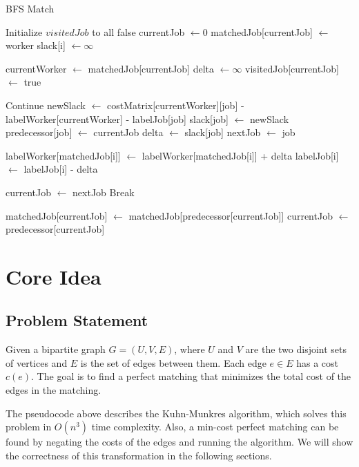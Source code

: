 \documentclass[a4paper,12pt]{article}
\begin{document}
\begin{algorithm}[H]
	\caption{BFS Match}
		Initialize $visitedJob$ to all false\;
		\BlankLine
		currentJob $\gets 0$\;
		matchedJob[currentJob] $\gets$ worker\;
		 {
			slack[i] $\gets \infty$\;
		}
		 {
			currentWorker $\gets$ matchedJob[currentJob]\;
			delta $\gets \infty$\;
			visitedJob[currentJob] $\gets$ true\;
			
			 {
				 {
					Continue\;
				}
				newSlack $\gets$ costMatrix[currentWorker][job] - labelWorker[currentWorker] - labelJob[job]\;
				 {
					slack[job] $\gets$ newSlack\;
					predecessor[job] $\gets$ currentJob\;
				}
				 {
					delta $\gets$ slack[job]\;
					nextJob $\gets$ job\;
				}
			}
			
			 {
				 {
					labelWorker[matchedJob[i]] $\gets$ labelWorker[matchedJob[i]] + delta\;
					labelJob[i] $\gets$ labelJob[i] - delta\;
				} 
			}
			
			currentJob $\gets$ nextJob\;
			 {
				Break\;
			}
		}
		
		 {
			matchedJob[currentJob] $\gets$ matchedJob[predecessor[currentJob]]\;
			currentJob $\gets$ predecessor[currentJob]\;
		}
\end{algorithm}

\section{Core Idea}

\subsection{Problem Statement}

Given a bipartite graph $G = (U, V, E)$, where $U$ and $V$ are the two disjoint sets of vertices and $E$ is the set of edges between them. 
Each edge $e \in E$ has a cost $c(e)$. 
The goal is to find a perfect matching that minimizes the total cost of the edges in the matching.

The pseudocode above describes the Kuhn-Munkres algorithm, which solves this problem in $O(n^3)$ time complexity.
Also, a min-cost perfect matching can be found by negating the costs of the edges and running the algorithm.
We will show the correctness of this transformation in the following sections.
\end{document}
